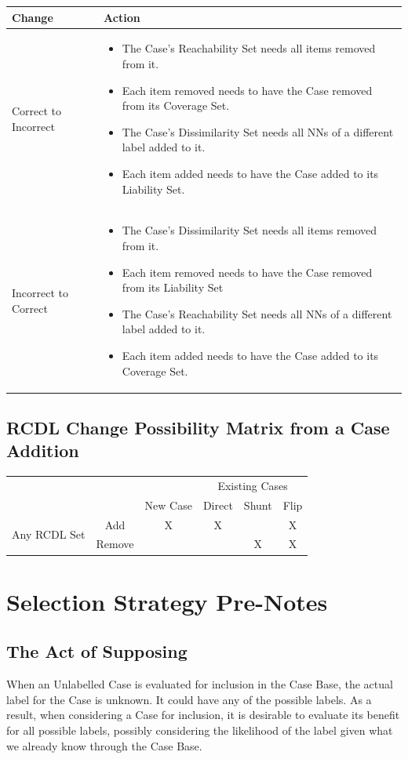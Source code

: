 \documentclass[a4paper,11pt]{report}
\begin{document}
\begin{tabular}{|x{55pt}|x{355pt}|}
\hline 
Change & Action \tabularnewline 
\hline 
Correct to Incorrect & 
\begin{itemize}
	\item The Case's Reachability Set needs all items removed from it.
	\item Each item removed needs to have the Case removed from its Coverage Set.
	\item The Case's Dissimilarity Set needs all NNs of a different label added to it.
	\item Each item added needs to have the Case added to its Liability Set.
\end{itemize} \tabularnewline 
\hline 
Incorrect to Correct & 
\begin{itemize}
	\item The Case's Dissimilarity Set needs all items removed from it.
	\item Each item removed needs to have the Case removed from its Liability Set
	\item The Case's Reachability Set needs all NNs of a different label added to it.
	\item Each item added needs to have the Case added to its Coverage Set.
\end{itemize} \tabularnewline 
\hline 
\end{tabular}	

\subsection{RCDL Change Possibility Matrix from a Case Addition\label{sec:rcdlchangematrix}}
\begin{tabular}{|c|c|c|c|c|c|}
\cline{4-6} 
\multicolumn{1}{c}{} & \multicolumn{1}{c}{} &  & \multicolumn{3}{c|}{Existing Cases}\tabularnewline
\cline{3-6} 
\multicolumn{1}{c}{} &  & New Case & Direct & Shunt & Flip\tabularnewline
\hline
\multirow{2}{*}{Any RCDL Set} & Add & X & X &  & X\tabularnewline
\cline{2-6} 
 & Remove &  &  & X & X\tabularnewline
\hline 
\end{tabular}
	
\section{Selection Strategy Pre-Notes}
\subsection{The Act of Supposing\label{sec:actofsupposing}}
When an Unlabelled Case is evaluated for inclusion in the Case Base, the actual label for the Case is unknown. It could have any of the possible labels. As a result, when considering a Case for inclusion, it is desirable to evaluate its benefit for all possible labels, possibly considering the likelihood of the label given what we already know through the Case Base.
\end{document}
